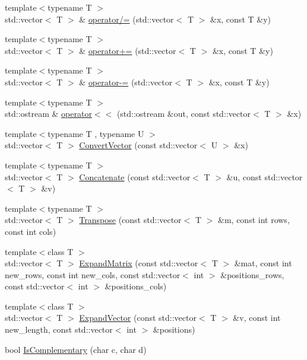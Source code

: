 \begin{DoxyCompactItemize}
\item 
{\footnotesize template$<$typename T $>$ }\\std\+::vector$<$ T $>$ \& \hyperlink{centroidalifold_2contrafold_2_utilities_8ipp_a93647e730c315e23104a566b3378b579}{operator/=} (std\+::vector$<$ T $>$ \&x, const T \&y)
\item 
{\footnotesize template$<$typename T $>$ }\\std\+::vector$<$ T $>$ \& \hyperlink{centroidalifold_2contrafold_2_utilities_8ipp_a3d01d5a3402946045dd14ec2747d804a}{operator+=} (std\+::vector$<$ T $>$ \&x, const T \&y)
\item 
{\footnotesize template$<$typename T $>$ }\\std\+::vector$<$ T $>$ \& \hyperlink{centroidalifold_2contrafold_2_utilities_8ipp_aaa19f8f84602aebf0399a95eacc57f75}{operator-\/=} (std\+::vector$<$ T $>$ \&x, const T \&y)
\item 
{\footnotesize template$<$typename T $>$ }\\std\+::ostream \& \hyperlink{centroidalifold_2contrafold_2_utilities_8ipp_af49746185f37a374b3443aac9437a813}{operator$<$$<$} (std\+::ostream \&out, const std\+::vector$<$ T $>$ \&x)
\item 
{\footnotesize template$<$typename T , typename U $>$ }\\std\+::vector$<$ T $>$ \hyperlink{centroidalifold_2contrafold_2_utilities_8ipp_a203b94ca459c645a42ff19c0e32f9d8f}{Convert\+Vector} (const std\+::vector$<$ U $>$ \&x)
\item 
{\footnotesize template$<$typename T $>$ }\\std\+::vector$<$ T $>$ \hyperlink{centroidalifold_2contrafold_2_utilities_8ipp_a699f9c877b339b8c0b945fdef29e33af}{Concatenate} (const std\+::vector$<$ T $>$ \&u, const std\+::vector$<$ T $>$ \&v)
\item 
{\footnotesize template$<$typename T $>$ }\\std\+::vector$<$ T $>$ \hyperlink{centroidalifold_2contrafold_2_utilities_8ipp_aca360a2e2018322c9ac6139cbafe3827}{Transpose} (const std\+::vector$<$ T $>$ \&m, const int rows, const int cols)
\item 
{\footnotesize template$<$class T $>$ }\\std\+::vector$<$ T $>$ \hyperlink{centroidalifold_2contrafold_2_utilities_8ipp_a4e494eed0ce3dbde725c013438efc02c}{Expand\+Matrix} (const std\+::vector$<$ T $>$ \&mat, const int new\+\_\+rows, const int new\+\_\+cols, const std\+::vector$<$ int $>$ \&positions\+\_\+rows, const std\+::vector$<$ int $>$ \&positions\+\_\+cols)
\item 
{\footnotesize template$<$class T $>$ }\\std\+::vector$<$ T $>$ \hyperlink{centroidalifold_2contrafold_2_utilities_8ipp_a3e4092b22afa5a8df86dcdafaefa74d0}{Expand\+Vector} (const std\+::vector$<$ T $>$ \&v, const int new\+\_\+length, const std\+::vector$<$ int $>$ \&positions)
\item 
bool \hyperlink{centroidalifold_2contrafold_2_utilities_8ipp_a97de122064ef1c636d8aa78953df68e1}{Is\+Complementary} (char c, char d)
\end{DoxyCompactItemize}


